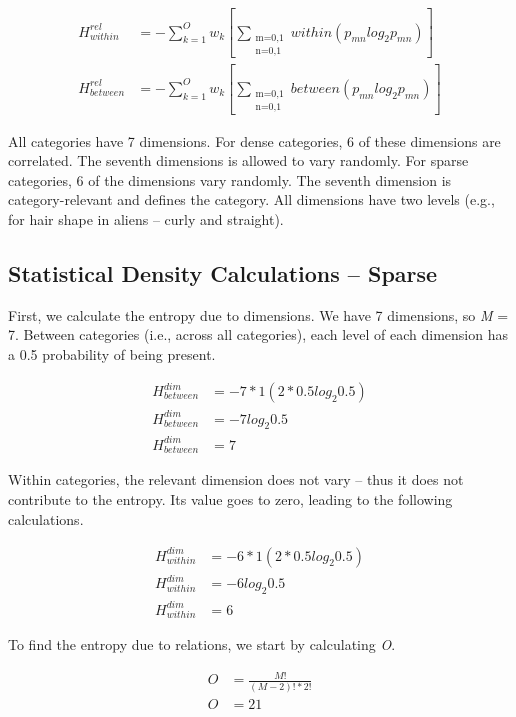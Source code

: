 \documentclass[../dissertation.tex]{subfiles}
\begin{document}
\begin{align*}
H^{rel}_{within} &= -\sum_{k=1}^{O}w_{k}[\sum_{\substack{\text{m=0,1} \\ \text{n=0,1}}}within(p_{mn}log_{2}p_{mn})]\\
H^{rel}_{between} &= -\sum_{k=1}^{O}w_{k}[\sum_{\substack{\text{m=0,1} \\ \text{n=0,1}}}between(p_{mn}log_{2}p_{mn})]
\end{align*}

All categories have 7 dimensions. For dense categories, 6 of these dimensions are correlated. The seventh dimensions is allowed to vary randomly. For sparse categories, 6 of the dimensions vary randomly. The seventh dimension is category-relevant and defines the category. All dimensions have two levels (e.g., for hair shape in aliens -- curly and straight). 

\subsection{Statistical Density Calculations -- Sparse}

First, we calculate the entropy due to dimensions. We have 7 dimensions, so \textit{M} = 7. Between categories (i.e., across all categories), each level of each dimension has a 0.5 probability of being present.

\begin{align*}
H^{dim}_{between} &= -7 * 1(2 * 0.5log_{2}0.5)\\
H^{dim}_{between} &= -7log_{2}0.5\\
H^{dim}_{between} &= 7
\end{align*}

Within categories, the relevant dimension does not vary -- thus it does not contribute to the entropy. Its value goes to zero, leading to the following calculations.

\begin{align*}
H^{dim}_{within} &= -6 * 1(2 * 0.5log_{2}0.5)\\
H^{dim}_{within} &= -6log_{2}0.5\\
H^{dim}_{within} &= 6
\end{align*}

To find the entropy due to relations, we start by calculating \textit{O}.

\begin{align*}
O &= \frac{M!}{(M-2)!*2!}\\
O &= 21
\end{align*}
\end{document}
